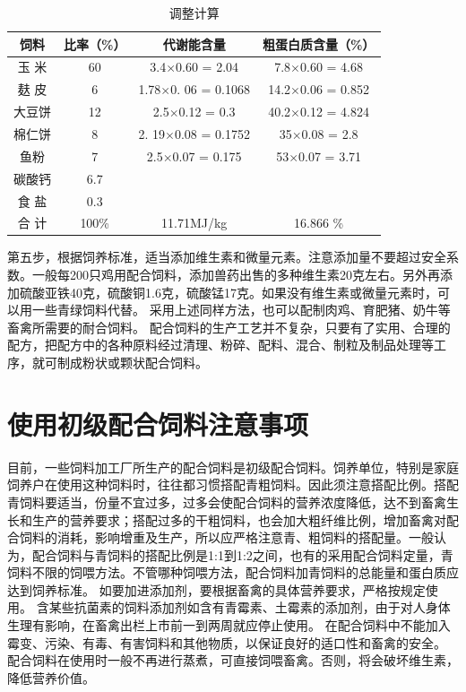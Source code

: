 \documentclass{ctexbook}
\begin{document}
\begin{table}[htbp]
	\centering
	\caption{调整计算}
	\begin{tabular}{c|c|c|c}
		\hline
饲料	&比率（\%）& 代谢能含量&	粗蛋白质含量（\%）\\ \hline 
玉 米&	60 &	3.4$\times$0.60 = 2.04 &	7.8$\times$0.60 = 4.68 \\ \hline
麸 皮&	6 &	1.78$\times$0. 06 = 0.1068 &	14.2$\times$0.06 = 0.852 \\ \hline
大豆饼&	12 &	2.5$\times$0.12 = 0.3&	40.2$\times$0.12 = 4.824 \\ \hline
棉仁饼&	8 &	2. 19$\times$0.08 = 0.1752&	35$\times$0.08 = 2.8 \\  \hline
鱼粉&	7 &	2.5$\times$0.07 = 0.175&	53$\times$0.07 = 3.71 \\ \hline
碳酸钙&	6.7 & &		 \\ \hline
食 盐&	0.3	&	& \\ \hline
合 计&	100\% &	11.71MJ/kg &	16.866 \% \\ \hline
	\end{tabular}%
	\label{tab:tiaozheng}%
\end{table}%
第五步，根据饲养标准，适当添加维生素和微量元素。注意添加量不要超过安全系数。一般每200只鸡用配合饲料，添加兽药出售的多种维生素20克左右。另外再添加硫酸亚铁40克，硫酸铜1.6克，硫酸锰17克。如果没有维生素或微量元素时，可以用一些青绿饲料代替。
采用上述同样方法，也可以配制肉鸡、育肥猪、奶牛等畜禽所需要的耐合饲料。
配合饲料的生产工艺并不复杂，只要有了实用、合理的配方，把配方中的各种原料经过清理、粉碎、配料、混合、制粒及制品处理等工序，就可制成粉状或颗状配合饲料。
\section{使用初级配合饲料注意事项}
目前，一些饲料加工厂所生产的配合饲料是初级配合饲料。饲养单位，特别是家庭饲养户在使用这种饲料时，往往都习惯搭配青粗饲料。因此须注意搭配比例。搭配青饲料要适当，份量不宜过多，过多会使配合饲料的营养浓度降低，达不到畜禽生长和生产的营养要求；搭配过多的干粗饲料，也会加大粗纤维比例，增加畜禽对配合饲料的消耗，影响增重及生产，所以应严格注意青、粗饲料的搭配量。一般认为，配合饲料与青饲料的搭配比例是1:1到1:2之间，也有的采用配合饲料定量，青饲料不限的饲喂方法。不管哪种饲喂方法，配合饲料加青饲料的总能量和蛋白质应达到饲养标准。
如要加进添加剂，要根据畜禽的具体营养要求，严格按规定使用。
含某些抗菌素的饲料添加剂如含有青霉素、土霉素的添加剂，由于对人身体生理有影响，在畜禽出栏上市前一到两周就应停止使用。
在配合饲料中不能加入霉变、污染、有毒、有害饲料和其他物质，以保证良好的适口性和畜禽的安全。
配合饲料在使用时一般不再进行蒸煮，可直接饲喂畜禽。否则，将会破坏维生素，降低营养价值。
\end{document}
